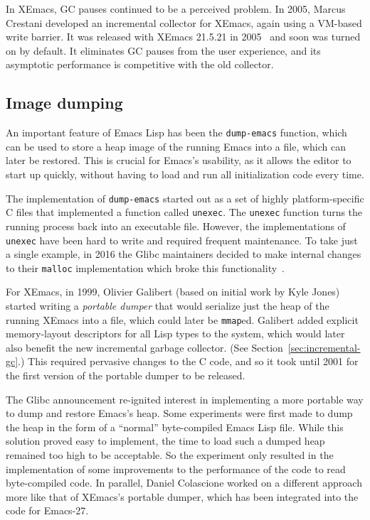 \documentclass[format=acmsmall, review]{acmart}
\newcommand \Elisp {Emacs Lisp}
\begin{document}
\label{sec:incremental-gc}
In XEmacs, GC pauses continued to be a perceived problem.  In 2005, Marcus
Crestani developed an incremental collector for XEmacs, again using
a VM-based write barrier.  It was released with XEmacs 21.5.21 in
2005~\cite{Crestani2005} and soon was turned on by default.  It
eliminates GC pauses from the user experience, and its asymptotic
performance is competitive with the old collector.

\subsection{Image dumping}
\label{sec:image-dumping}

An important feature of \Elisp{} has been the \texttt{dump-emacs}
function, which can be used to store a heap image of the running Emacs
into a file, which can later be restored.  This is crucial for Emacs's
usability, as it allows the editor to start up quickly, without
having to load and run all initialization code every time.

The implementation of \texttt{dump-emacs} started out as a set of highly
platform-specific C files that implemented a function called
\texttt{unexec}.  The \texttt{unexec} function turns the running process
back into an executable file.  However, the implementations of
\texttt{unexec} have been hard to write and required frequent maintenance.
To take just a single example, in 2016 the Glibc maintainers decided to make
internal changes to their \texttt{malloc} implementation which broke this
functionality~\cite{UnexecGlibc}.

For XEmacs, in 1999, Olivier Galibert (based on initial work by Kyle
Jones) started writing a \emph{portable dumper} that would serialize
just the heap of the running XEmacs into a file, which could later be
\texttt{mmap}ed.  Galibert added explicit memory-layout descriptors
for all Lisp types to the system, which would later also benefit the
new incremental garbage collector.  (See
Section~\ref{sec:incremental-gc}.)  This required pervasive changes to
the C code, and so it took until 2001 for the first version of the
portable dumper to be released.

The Glibc announcement re-ignited interest in implementing a more portable
way to dump and restore Emacs's heap.  Some experiments were first made to dump
the heap in the form of a ``normal'' byte-compiled \Elisp{} file.
While this solution proved easy to implement, the time to load such a dumped
heap remained too high to be acceptable.  So the experiment only resulted in
the implementation of some improvements to the performance of the code to
read byte-compiled code.  In parallel, Daniel Colascione worked on
a different approach more like that of XEmacs's portable dumper, which has
been integrated into the code for Emacs-27.
\end{document}

